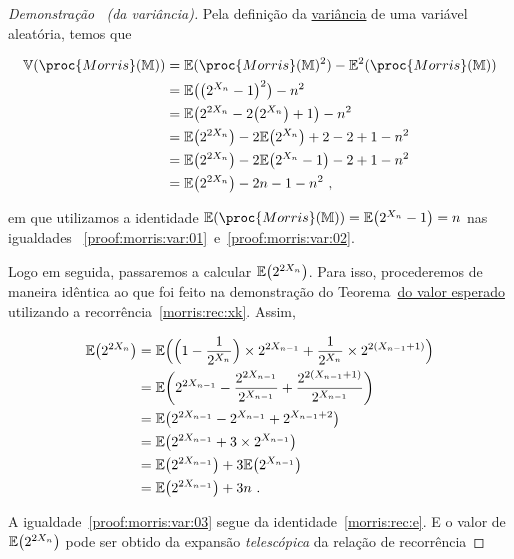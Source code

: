 \begin{proof}[Demonstração \ (da variância)]
  Pela definição da \hyperref[ap:variance]{variância} de uma variável aleatória, temos que

  \begin{align}
    \Vbb(\proc{Morris}(\Mbb))
    &= \Ebb(\proc{Morris}(\Mbb)^2) - \Ebb^2(\proc{Morris}(\Mbb)) \nonumber \\ 
    &= \Ebb\big(\big(2^{X_n} - 1\big)^2\big) - n^2 \label{proof:morris:var:01} \\
    &= \Ebb\big(2^{2X_n} - 2\big(2^{X_n}\big) + 1\big) - n^2 \nonumber \\
    &= \Ebb\big(2^{2X_n}\big) - 2\Ebb\big(2^{X_n}\big) + 2 - 2 + 1 - n^2 \nonumber \\
    &= \Ebb\big(2^{2X_n}\big) - 2\Ebb\big(2^{X_n} - 1\big) - 2 + 1 - n^2 \nonumber \\
    &= \Ebb\big(2^{2X_n}\big) - 2n - 1 - n^2 \label{proof:morris:var:02} \ ,
  \end{align}

  em que utilizamos a identidade $\Ebb(\proc{Morris}(\Mbb)) = \Ebb\big(2^{X_n} - 1\big) = n$ nas igualdades~
  \eqref{proof:morris:var:01}~e~\eqref{proof:morris:var:02}.

  Logo em seguida, passaremos a calcular $\mathbb{E}\big(2^{2X_n}\big)$. Para isso, procederemos de maneira idêntica ao que 
  foi feito na demonstração do Teorema~\hyperref[morris:theorem:expected_value]{do valor esperado} utilizando a 
  recorrência~\eqref{morris:rec:xk}. Assim,

  \begin{align}
    \mathbb{E}\big(2^{2X_n}\big)
    &=  \mathbb{E}\Big(\Big(1 - \frac{1}{2^{X_n}}\Big) \times 2^{2X_{n - 1}} + \frac{1}{2^{X_n}} \times 2^{2(X_{n-1} 
        + 1)}\Big) \nonumber \\
    &=  \mathbb{E}\bigg(2^{2X_{n-1}} - \frac{2^{2X_{n-1}}}{2^{X_{n-1}}} + \frac{2^{2(X_{n-1}+1)}}{2^{X_{n-1}}}\bigg) 
        \nonumber \\
    &= \mathbb{E}\big(2^{2X_{n-1}} -2^{X_{n-1}} + 2^{X_{n-1}+2}\big) \nonumber \\
    &= \mathbb{E}\big(2^{2X_{n-1}} + 3 \times 2^{X_{n-1}}\big) \nonumber \\
    &= \mathbb{E}\big(2^{2X_{n-1}}\big) + 3\mathbb{E}\big(2^{X_{n-1}}\big) \label{proof:morris:var:03} \\
    &= \mathbb{E}\big(2^{2X_{n-1}}\big) + 3n  \ . \nonumber
  \end{align}

  A igualdade~\eqref{proof:morris:var:03} segue da identidade~\eqref{morris:rec:e}. E o valor de 
  $\mathbb{E}\big(2^{2X_n}\big)$ pode ser obtido da expansão \textit{telescópica} da relação de recorrência


\end{proof}
